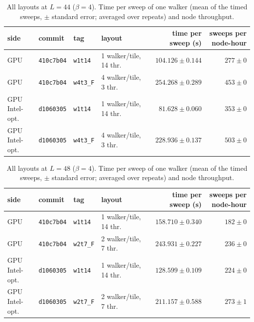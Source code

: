 \begin{table}[h]\centering\small
\caption{All layouts at $L=44$ ($\beta=4$). Time per sweep of one walker (mean of the timed sweeps, $\pm$ standard error; averaged over repeats) and node throughput.}
\begin{tabular}{@{}llllrr@{}}\toprule
side & commit & tag & layout & time per sweep (s) & sweeps per node-hour\\\midrule
GPU & \texttt{410c7b04} & \texttt{w1t14} & 1 walker/tile, 14 thr. & $104.126 \pm 0.144$ & $277 \pm 0$\\
GPU & \texttt{410c7b04} & \texttt{w4t3\_F} & 4 walker/tile, 3 thr. & $254.268 \pm 0.289$ & $453 \pm 0$\\
GPU Intel-opt. & \texttt{d1060305} & \texttt{w1t14} & 1 walker/tile, 14 thr. & $81.628 \pm 0.060$ & $353 \pm 0$\\
GPU Intel-opt. & \texttt{d1060305} & \texttt{w4t3\_F} & 4 walker/tile, 3 thr. & $228.936 \pm 0.137$ & $503 \pm 0$\\
\bottomrule\end{tabular}\end{table}
\begin{table}[h]\centering\small
\caption{All layouts at $L=48$ ($\beta=4$). Time per sweep of one walker (mean of the timed sweeps, $\pm$ standard error; averaged over repeats) and node throughput.}
\begin{tabular}{@{}llllrr@{}}\toprule
side & commit & tag & layout & time per sweep (s) & sweeps per node-hour\\\midrule
GPU & \texttt{410c7b04} & \texttt{w1t14} & 1 walker/tile, 14 thr. & $158.710 \pm 0.340$ & $182 \pm 0$\\
GPU & \texttt{410c7b04} & \texttt{w2t7\_F} & 2 walker/tile, 7 thr. & $243.931 \pm 0.227$ & $236 \pm 0$\\
GPU Intel-opt. & \texttt{d1060305} & \texttt{w1t14} & 1 walker/tile, 14 thr. & $128.599 \pm 0.109$ & $224 \pm 0$\\
GPU Intel-opt. & \texttt{d1060305} & \texttt{w2t7\_F} & 2 walker/tile, 7 thr. & $211.157 \pm 0.588$ & $273 \pm 1$\\
\bottomrule\end{tabular}\end{table}
